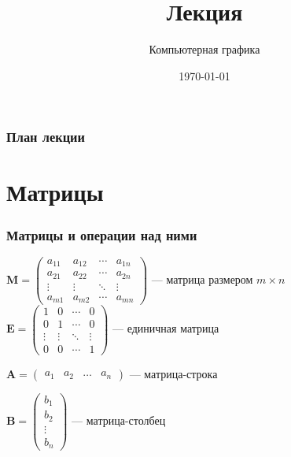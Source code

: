 \documentclass[10pt]{beamer}
\date{\today}
\title{Лекция \lecdni \\ \LectionTheme}
\subtitle{Компьютерная графика}
\begin{document}
 		 

    
    \QRFRAME
	
	
	\frame{\maketitle}
	
	
	
	\begin{frame}\frametitle{План лекции}
		\tableofcontents
	\end{frame}
	
	\section{Матрицы}
	\frame{\sectionpage}
	
	\begin{frame}\frametitle{Матрицы и операции над ними}
		$\mathbf M =
		\begin{pmatrix} a_{11} & a_{12} & \cdots & a_{1n}
			\\a_{21} & a_{22} & \cdots & a_{2n}
			\\ \vdots & \vdots & \ddots & \vdots
			\\ a_{m1} & a_{m2} & \cdots & a_{mn}
		\end{pmatrix} 
		$ --- матрица размером $m \times n$ \\
		$\mathbf E = \begin{pmatrix} 1 & 0 & \cdots & 0 \\ 0 & 1 & \cdots & 0 \\ \vdots & \vdots & \ddots & \vdots \\ 0 & 0 & \cdots & 1 \end{pmatrix}$ --- единичная матрица
		
		$\mathbf A = \begin{pmatrix}
			a_1 & a_2 & \ldots & a_n
		\end{pmatrix}$ --- матрица-строка
		
		$\mathbf B = \begin{pmatrix}
			b_1 \\ b_2 \\ \vdots \\ b_n
		\end{pmatrix}$ --- матрица-столбец	
		
	\end{frame}
	
\end{document}
